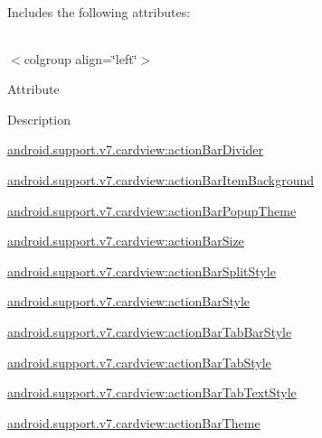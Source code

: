 Includes the following attributes\+:

\tabulinesep=1mm
\begin{longtabu} spread 0pt [c]{*{0}{|X[-1]}|}
\hline
\end{longtabu}
$<$colgroup align=\char`\"{}left\char`\"{}$>$ 

Attribute

Description 

{\ttfamily \hyperlink{classandroid_1_1support_1_1v7_1_1cardview_1_1R_1_1styleable_ac34be2954e08817451f01ab1463f255e}{android.\+support.\+v7.\+cardview\+:action\+Bar\+Divider}}

{\ttfamily \hyperlink{classandroid_1_1support_1_1v7_1_1cardview_1_1R_1_1styleable_a7d5d06ba7d63aa6454a9674a766d055f}{android.\+support.\+v7.\+cardview\+:action\+Bar\+Item\+Background}}

{\ttfamily \hyperlink{classandroid_1_1support_1_1v7_1_1cardview_1_1R_1_1styleable_a3963e0347226bf61f80567cb825e8ee2}{android.\+support.\+v7.\+cardview\+:action\+Bar\+Popup\+Theme}}

{\ttfamily \hyperlink{classandroid_1_1support_1_1v7_1_1cardview_1_1R_1_1styleable_af90bee6c34b66aba2ac6c560cab1a628}{android.\+support.\+v7.\+cardview\+:action\+Bar\+Size}}

{\ttfamily \hyperlink{classandroid_1_1support_1_1v7_1_1cardview_1_1R_1_1styleable_ab8a026b209f8ec93d6972d986e7780ae}{android.\+support.\+v7.\+cardview\+:action\+Bar\+Split\+Style}}

{\ttfamily \hyperlink{classandroid_1_1support_1_1v7_1_1cardview_1_1R_1_1styleable_a6ee7326e5eb8f855d6bb21269c3cd5c4}{android.\+support.\+v7.\+cardview\+:action\+Bar\+Style}}

{\ttfamily \hyperlink{classandroid_1_1support_1_1v7_1_1cardview_1_1R_1_1styleable_a62fc2bc35ec89e449e1937f9d5f64823}{android.\+support.\+v7.\+cardview\+:action\+Bar\+Tab\+Bar\+Style}}

{\ttfamily \hyperlink{classandroid_1_1support_1_1v7_1_1cardview_1_1R_1_1styleable_a05482cda1e27909ff5d3f7e056408426}{android.\+support.\+v7.\+cardview\+:action\+Bar\+Tab\+Style}}

{\ttfamily \hyperlink{classandroid_1_1support_1_1v7_1_1cardview_1_1R_1_1styleable_a918e33615d661042e8d857f74c194f01}{android.\+support.\+v7.\+cardview\+:action\+Bar\+Tab\+Text\+Style}}

{\ttfamily \hyperlink{classandroid_1_1support_1_1v7_1_1cardview_1_1R_1_1styleable_a0afa910c9139ab9dc1ed8bf0bde0fb30}{android.\+support.\+v7.\+cardview\+:action\+Bar\+Theme}}

